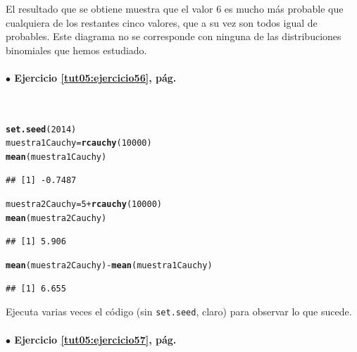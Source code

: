 \documentclass[10pt,a4paper]{article}\usepackage[]{graphicx}\usepackage[]{color}
\makeatletter
\newcommand{\hlnum}[1]{\textcolor[rgb]{0.686,0.059,0.569}{#1}}%
\newcommand{\hlopt}[1]{\textcolor[rgb]{0,0,0}{#1}}%
\newcommand{\hlstd}[1]{\textcolor[rgb]{0.345,0.345,0.345}{#1}}%
\newcommand{\hlkwb}[1]{\textcolor[rgb]{0.69,0.353,0.396}{#1}}%
\newcommand{\hlkwd}[1]{\textcolor[rgb]{0.737,0.353,0.396}{\textbf{#1}}}%
\newenvironment{kframe}{%
 \def\at@end@of@kframe{}%
 \ifinner\ifhmode%
  \def\at@end@of@kframe{\end{minipage}}%
  \begin{minipage}{\columnwidth}%
 \fi\fi%
 \def\FrameCommand##1{\hskip\@totalleftmargin \hskip-\fboxsep
 \colorbox{shadecolor}{##1}\hskip-\fboxsep
     \hskip-\linewidth \hskip-\@totalleftmargin \hskip\columnwidth}%
 \MakeFramed {\advance\hsize-\width
   \@totalleftmargin\z@ \linewidth\hsize
   \@setminipage}}%
 {\par\unskip\endMakeFramed%
 \at@end@of@kframe}
\newenvironment{knitrout}{}{} %
\makeatother
\begin{document}
El resultado que se obtiene muestra que el valor $6$ es mucho más  probable que cualquiera de los restantes cinco valores, que a su vez son todos igual de probables. Este diagrama no se corresponde con ninguna de las distribuciones binomiales que hemos estudiado.

\paragraph{\bf $\bullet$ Ejercicio \ref{tut05:ejercicio56}, pág. \pageref{tut05:ejercicio56}}
\label{tut05:ejercicio56:sol}\quad\\


\begin{knitrout}
\color{fgcolor}\begin{kframe}
\begin{alltt}
\hlkwd{set.seed}\hlstd{(}\hlnum{2014}\hlstd{)}
\hlstd{muestra1Cauchy} \hlkwb{=} \hlkwd{rcauchy}\hlstd{(}\hlnum{10000}\hlstd{)}
\hlkwd{mean}\hlstd{(muestra1Cauchy)}
\end{alltt}
\begin{verbatim}
## [1] -0.7487
\end{verbatim}
\begin{alltt}
\hlstd{muestra2Cauchy} \hlkwb{=} \hlnum{5} \hlopt{+} \hlkwd{rcauchy}\hlstd{(}\hlnum{10000}\hlstd{)}
\hlkwd{mean}\hlstd{(muestra2Cauchy)}
\end{alltt}
\begin{verbatim}
## [1] 5.906
\end{verbatim}
\begin{alltt}
\hlkwd{mean}\hlstd{(muestra2Cauchy)} \hlopt{-} \hlkwd{mean}\hlstd{(muestra1Cauchy)}
\end{alltt}
\begin{verbatim}
## [1] 6.655
\end{verbatim}
\end{kframe}
\end{knitrout}
Ejecuta varias veces el código (sin {\tt set.seed}, claro) para observar lo que sucede.












\paragraph{\bf $\bullet$ Ejercicio \ref{tut05:ejercicio57}, pág. \pageref{tut05:ejercicio57}}
\label{tut05:ejercicio57:sol}\quad\\
\end{document}
